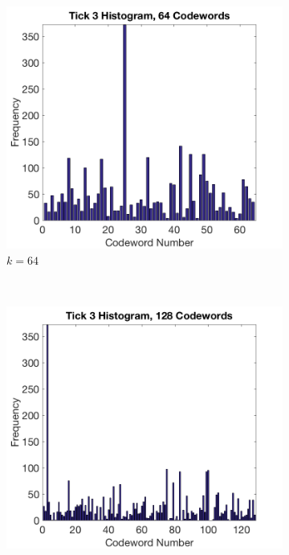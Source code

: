 \documentclass[a4paper, 10pt, conference]{ieeeconf}
\begin{document}
\begin{figure}[!ht]
  \captionsetup[subfigure]{position=b}
  \centering
    \begin{subfigure}{0.45\linewidth}
      \includegraphics[width=\textwidth]{img/tick3_64}
      \caption{$k = 64$}
      \label{fig:diffk64}
    \end{subfigure}
    ~
    \begin{subfigure}{0.45\linewidth}
      \includegraphics[width=\textwidth]{img/tick3_128}

\end{subfigure}
\end{figure}
\end{document}
